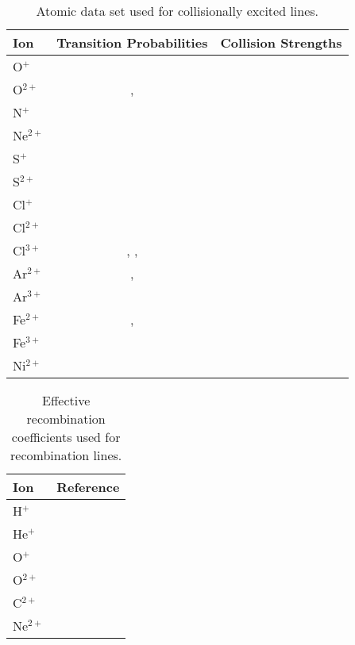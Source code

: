 \documentclass[fleqn,usenatbib]{mnras}
\begin{document}
\begin{table*}
\caption{Atomic data set used for collisionally excited lines.}
\label{tab:atomic_data}
\begin{tabular}{lcc}
\hline
\multicolumn{1}{l}{Ion} & \multicolumn{1}{c}{Transition Probabilities} &
\multicolumn{1}{c}{Collision Strengths} \\
\hline

O$^{+}$   &  \citet{Fischer04} & \citet{Kisielius09}\\
O$^{2+}$  &  \citet{Wiese96}, \citet*{Storey00} & \citet{Storey14}\\
N$^{+}$   &  \citet{Fischer04} & \citet{Tayal11}\\
Ne$^{2+}$  &  \citet{McLaughlin11} & \citet{McLaughlin11}\\
S$^{+}$   &  \citet{Podobedova09} & \citet{Tayal10}\\
S$^{2+}$  &  \citet{Podobedova09} & \citet{Grieve14}\\
Cl$^{+}$ &  \citet{Mendoza83} & \citet{Tayal04}\\
Cl$^{2+}$ &  \citet{Fritzsche99} & \citet{Butler89}\\
Cl$^{3+}$ &  \citet{Kaufman86}, \citet{Mendoza82a}, \citet{Ellis84} & \citet{Galavis95}\\
Ar$^{2+}$ &   \citet{Mendoza83_2}, \citet{Kaufman86}  & \citet*{Galavis95}\\
Ar$^{3+}$ &   \citet{Mendoza82b}  & \citet{Ramsbottom97}\\
Fe$^{2+}$ & \citet{Quinet96} , \citet{Johansson00} & \citet{Zhang96}\\
Fe$^{3+}$ & \citet{Fischer08} & \citet{Zhang97}\\
Ni$^{2+}$ & \citet{Bautista01} & \citet{Bautista01}\\
\hline
\end{tabular}
\end{table*}

\begin{table}
\caption{Effective recombination coefficients used for recombination lines.}
\label{tab:rec_atomic_data}
\begin{tabular}{lc}
\hline
\multicolumn{1}{l}{Ion} & \multicolumn{1}{c}{Reference}  \\
\hline
H$^{+}$   & \citet{Storey95}\\
He$^{+}$   & \citet{Porter12,Porter13}\\
O$^{+}$   & \citet{Pequignot91}\\
O$^{2+}$   & \citet{Storey17}\\
C$^{2+}$   & \citet{Davey00}\\
Ne$^{2+}$   & \citet{Kisielius98}\\
\hline
\end{tabular}
\end{table}
\end{document}
